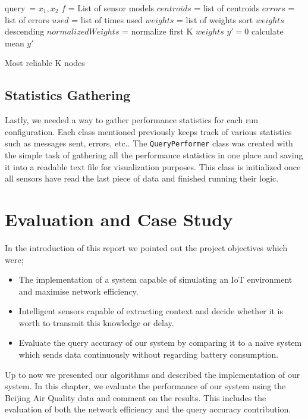 \documentclass{mproj}
\begin{document}
\begin{algorithm}[H]
 query\ = $x_1,x_2$\;
 $f$ = List of sensor models\;
 $centroids$ = list of centroids\;
 $errors$ = list of errors\;
 $used$ = list of times used\;
 $weights$ = list of weights\;
 sort $weights$ descending\;
 $normalizedWeights$ = normalize first K $weights$\;
 $y'=0$\;
 calculate mean $y'$\;
 \caption{Most reliable K nodes}
 \label{alg:reliableModels}
\end{algorithm}

\section{Statistics Gathering}
Lastly, we needed a way to gather performance statistics for each run configuration. Each class mentioned previously keeps track of various statistics such as messages sent, errors, etc.. The \texttt{QueryPerformer} class was created with the simple task of gathering all the performance statistics in one place and saving it into a readable text file for visualization purposes. This class is initialized once all sensors have read the last piece of data and finished running their logic.

\chapter{Evaluation and Case Study}
In the introduction of this report we pointed out the project objectives which were;
\begin{itemize}  
\item The implementation of a system capable of simulating an IoT environment and maximise network efficiency.
\item Intelligent sensors capable of extracting context and decide whether it is worth to transmit this knowledge or delay.
\item Evaluate the query accuracy of our system by comparing it to a naive system which sends data continuously without regarding battery consumption.  
\end{itemize} 
Up to now we presented our algorithms and described the implementation of our system. In this chapter, we evaluate the performance of our system using the Beijing Air Quality data\cite{air-quality-inference-meets-big-data} and comment on the results. This includes the evaluation of both the network efficiency and the query accuracy contribution.
\end{document}
